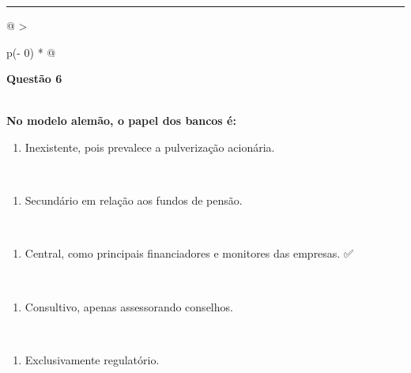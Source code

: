 \documentclass[
]{book}
\providecommand{\tightlist}{%
  \setlength{\itemsep}{0pt}\setlength{\parskip}{0pt}}
\begin{document}
\begin{center}\rule{0.5\linewidth}{0.5pt}\end{center}

\begin{longtable}[]{@{}
  >{\raggedright\arraybackslash}p{(\columnwidth - 0\tabcolsep) * }@{}}
\toprule\noalign{}
\begin{minipage}[b]{\linewidth}\raggedright
\textbf{Questão 6}
\end{minipage} \\
\midrule\noalign{}
\endhead
\bottomrule\noalign{}
\endlastfoot
\textbf{No modelo alemão, o papel dos bancos é:} \\
\begin{minipage}[t]{\linewidth}\raggedright
\begin{enumerate}
\def\labelenumi{\alph{enumi})}
\tightlist
\item
  Inexistente, pois prevalece a pulverização acionária.
\end{enumerate}
\end{minipage} \\
\begin{minipage}[t]{\linewidth}\raggedright
\begin{enumerate}
\def\labelenumi{\alph{enumi})}
\setcounter{enumi}{1}
\tightlist
\item
  Secundário em relação aos fundos de pensão.
\end{enumerate}
\end{minipage} \\
\begin{minipage}[t]{\linewidth}\raggedright
\begin{enumerate}
\def\labelenumi{\alph{enumi})}
\setcounter{enumi}{2}
\tightlist
\item
  Central, como principais financiadores e monitores das empresas. ✅
\end{enumerate}
\end{minipage} \\
\begin{minipage}[t]{\linewidth}\raggedright
\begin{enumerate}
\def\labelenumi{\alph{enumi})}
\setcounter{enumi}{3}
\tightlist
\item
  Consultivo, apenas assessorando conselhos.
\end{enumerate}
\end{minipage} \\
\begin{minipage}[t]{\linewidth}\raggedright
\begin{enumerate}
\def\labelenumi{\alph{enumi})}
\setcounter{enumi}{4}
\tightlist
\item
  Exclusivamente regulatório.
\end{enumerate}
\end{minipage} \\
 \\
\end{longtable}
\end{document}
